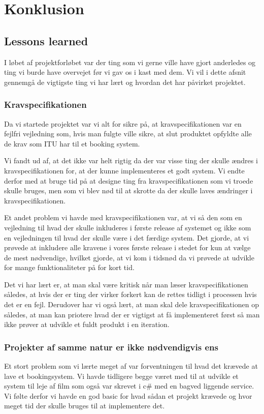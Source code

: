 \chapter{Konklusion}
\label{Konklusion}
\section{Lessons learned}
\label{Konklusion_Lessons}
I løbet af projektforløbet var der ting som vi gerne ville have gjort anderledes og ting vi burde have overvejet før vi gav os i kast med dem. Vi vil i dette afsnit gennemgå de vigtigste ting vi har lært og hvordan det har påvirket projektet.

\subsection{Kravspecifikationen}
\label{Konklusion_Lessons_Krav}
Da vi startede projektet var vi alt for sikre på, at kravspecifikationen var en fejlfri vejledning som, hvis man fulgte ville sikre, at slut produktet opfyldte alle de krav som ITU har til et booking system.

Vi fandt ud af, at det ikke var helt rigtig da der var visse ting der skulle ændres i kravspecifikationen for, at der kunne implementeres et godt system. Vi endte derfor med at bruge tid på at designe ting fra kravspecifikationen som vi troede skulle bruges, men som vi blev nød til at skrotte da der skulle laves ændringer i kravspecifikationen.

Et andet problem vi havde med kravspecifikationen var, at vi så den som en vejledning til hvad der skulle inkluderes i første release af systemet og ikke som en vejledningen til hvad der skulle være i det færdige system.
Det gjorde, at vi prøvede at inkludere alle kravene i vores første release i stedet for kun at vælge de mest nødvendige, hvilket gjorde, at vi kom i tidsnød da vi prøvede at udvikle for mange funktionaliteter på for kort tid.

Det vi har lært er, at man skal være kritisk når man  læser kravspecifikationen således, at hvis der er ting der virker forkert kan de rettes tidligt i processen hvis det er en fejl. Derudover har vi også lært, at man skal dele kravspecifikationen op således, at man kan priotere hvad der er vigtigst at få implementeret først så man ikke prøver at udvikle et fuldt produkt i en iteration.

\subsection{Projekter af samme natur er ikke nødvendigvis ens}
\label{Konklusion_Lessons_Projekt}
Et stort problem som vi lærte meget af var forventningen til hvad det krævede at lave et bookingsystem. Vi havde tidligere begge været med til at udvikle et system til leje af film som også var skrevet i c\# med en bagved liggende service. Vi følte derfor vi havde en god basic for hvad sådan et projekt krævede og hvor meget tid der skulle bruges til at implementere det.

